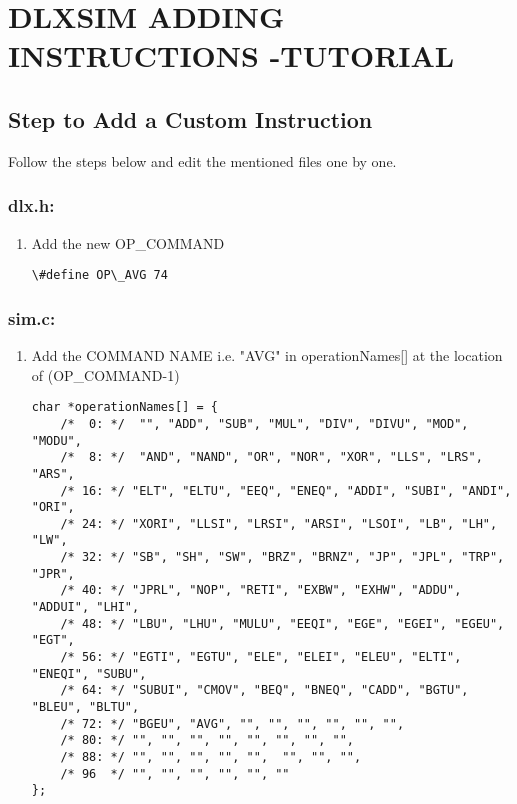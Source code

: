 \chapter*{DLXSIM ADDING INSTRUCTIONS -TUTORIAL}
\section*{Step to Add a Custom Instruction}
Follow the steps below and edit the mentioned files one by one.

\subsection{dlx.h:}
\begin{enumerate}
\item Add the new OP\_COMMAND
\begin{lstlisting}
\#define OP\_AVG 74
\end{lstlisting}
\end{enumerate}
\subsection{sim.c:}
\begin{enumerate}[resume]
\item Add the COMMAND NAME i.e. "AVG" in operationNames{[}{]} at the location of (OP\_COMMAND-1)
\begin{lstlisting}
char *operationNames[] = {
	/*  0: */  "", "ADD", "SUB", "MUL", "DIV", "DIVU", "MOD", "MODU",
	/*  8: */  "AND", "NAND", "OR", "NOR", "XOR", "LLS", "LRS", "ARS",
	/* 16: */ "ELT", "ELTU", "EEQ", "ENEQ", "ADDI", "SUBI", "ANDI", "ORI",
	/* 24: */ "XORI", "LLSI", "LRSI", "ARSI", "LSOI", "LB", "LH", "LW",
	/* 32: */ "SB", "SH", "SW", "BRZ", "BRNZ", "JP", "JPL", "TRP", "JPR",
	/* 40: */ "JPRL", "NOP", "RETI", "EXBW", "EXHW", "ADDU", "ADDUI", "LHI",
	/* 48: */ "LBU", "LHU", "MULU", "EEQI", "EGE", "EGEI", "EGEU", "EGT",
	/* 56: */ "EGTI", "EGTU", "ELE", "ELEI", "ELEU", "ELTI", "ENEQI", "SUBU",
	/* 64: */ "SUBUI", "CMOV", "BEQ", "BNEQ", "CADD", "BGTU", "BLEU", "BLTU",
	/* 72: */ "BGEU", "AVG", "", "", "", "", "", "",
	/* 80: */ "", "", "", "", "", "", "", "",
	/* 88: */ "", "", "", "", "",  "", "", "",
	/* 96  */ "", "", "", "", "", ""
};
\end{lstlisting}
\end{enumerate}
